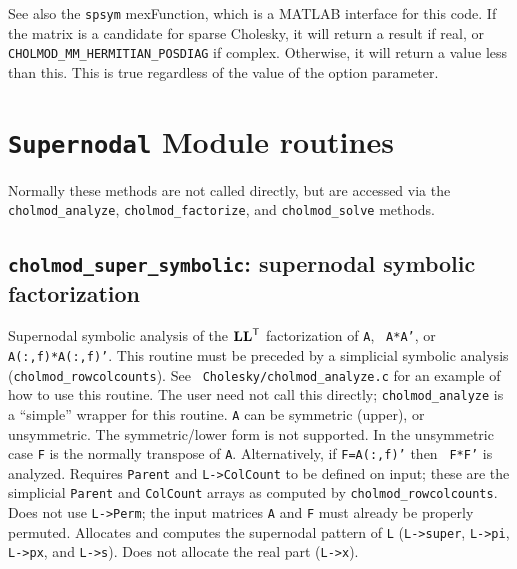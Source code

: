 \documentclass[11pt]{article}
\newcommand{\m}[1]{{\bf{#1}}}       %
\newcommand{\tr}{^{\sf T}}          %
\begin{document}
See also the {\tt spsym} mexFunction, which is a MATLAB interface for this
code.  If the matrix is a candidate for sparse Cholesky, it will return a
result  if real, or {\tt
CHOLMOD\_MM\_HERMITIAN\_POSDIAG} if complex.  Otherwise, it will return a value
less than this.  This is true regardless of the value of the option parameter.

\newpage \section{{\tt Supernodal} Module routines}

Normally these methods are not called directly, but are accessed via the
\verb'cholmod_analyze', \verb'cholmod_factorize', and \verb'cholmod_solve'
methods.

\subsection{{\tt cholmod\_super\_symbolic}: supernodal symbolic factorization}


Supernodal symbolic analysis of the $\m{LL}\tr$ factorization of {\tt A}, {\tt
A*A'}, or {\tt A(:,f)*A(:,f)'}.  This routine must be preceded by a simplicial
symbolic analysis ({\tt cholmod\_rowcolcounts}).  See {\tt
Cholesky/cholmod\_analyze.c} for an example of how to use this routine.  The
user need not call this directly; {\tt cholmod\_analyze} is a ``simple''
wrapper for this routine.  {\tt A} can be symmetric (upper), or unsymmetric.
The symmetric/lower form is not supported.  In the unsymmetric case {\tt F} is
the normally transpose of {\tt A}.  Alternatively, if {\tt F=A(:,f)'} then {\tt
F*F'} is analyzed.  Requires {\tt Parent} and {\tt L->ColCount} to be defined
on input; these are the simplicial {\tt Parent} and {\tt ColCount} arrays as
computed by {\tt cholmod\_rowcolcounts}.  Does not use {\tt L->Perm}; the input
matrices {\tt A} and {\tt F} must already be properly permuted.  Allocates and
computes the supernodal pattern of {\tt L} ({\tt L->super}, {\tt L->pi}, {\tt
L->px}, and {\tt L->s}).  Does not allocate the real part ({\tt L->x}).

\end{document}
